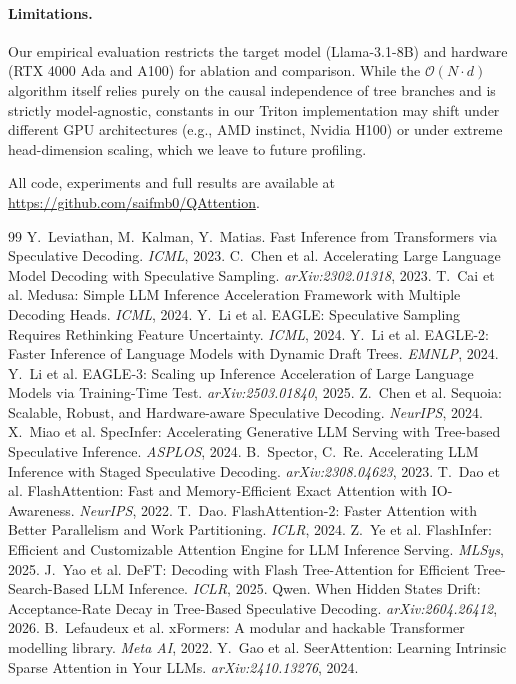 \documentclass{article}
\newcommand{\bigO}[1]{\mathcal{O}(#1)}
\newcommand{\numtokens}{N}
\newcommand{\depth}{d}
\begin{document}
\paragraph{Limitations.}
Our empirical evaluation restricts the target model (Llama-3.1-8B) and
hardware (RTX 4000 Ada and A100) for ablation and comparison.
While the $\bigO{\numtokens\!\cdot\!\depth}$ algorithm itself relies purely on
the causal independence of tree branches and is strictly model-agnostic,
constants in our Triton implementation may shift under different GPU
architectures (e.g., AMD instinct, Nvidia H100) or under extreme
head-dimension scaling, which we leave to future profiling.

All code, experiments and full results are available at \url{https://github.com/saifmb0/QAttention}.


\begin{thebibliography}{99}\small
{} Y.\ Leviathan, M.\ Kalman, Y.\ Matias.
  Fast Inference from Transformers via Speculative Decoding. \emph{ICML}, 2023.
 C.\ Chen et al.
  Accelerating Large Language Model Decoding with Speculative Sampling.
  \emph{arXiv:2302.01318}, 2023.
 T.\ Cai et al.
  Medusa: Simple LLM Inference Acceleration Framework with Multiple Decoding Heads.
  \emph{ICML}, 2024.
 Y.\ Li et al.
  EAGLE: Speculative Sampling Requires Rethinking Feature Uncertainty. \emph{ICML}, 2024.
 Y.\ Li et al.
  EAGLE-2: Faster Inference of Language Models with Dynamic Draft Trees.
  \emph{EMNLP}, 2024.
 Y.\ Li et al.
  EAGLE-3: Scaling up Inference Acceleration of Large Language Models via Training-Time Test.
  \emph{arXiv:2503.01840}, 2025.
 Z.\ Chen et al.
  Sequoia: Scalable, Robust, and Hardware-aware Speculative Decoding.
  \emph{NeurIPS}, 2024.
 X.\ Miao et al.
  SpecInfer: Accelerating Generative LLM Serving with Tree-based Speculative Inference.
  \emph{ASPLOS}, 2024.
 B.\ Spector, C.\ Re.
  Accelerating LLM Inference with Staged Speculative Decoding.
  \emph{arXiv:2308.04623}, 2023.
 T.\ Dao et al.
  FlashAttention: Fast and Memory-Efficient Exact Attention with IO-Awareness.
  \emph{NeurIPS}, 2022.
 T.\ Dao.
  FlashAttention-2: Faster Attention with Better Parallelism and Work Partitioning.
  \emph{ICLR}, 2024.
 Z.\ Ye et al.
  FlashInfer: Efficient and Customizable Attention Engine for LLM Inference Serving.
  \emph{MLSys}, 2025.
 J.\ Yao et al.
  DeFT: Decoding with Flash Tree-Attention for Efficient Tree-Search-Based LLM Inference.
  \emph{ICLR}, 2025.
 Qwen.
  When Hidden States Drift: Acceptance-Rate Decay in Tree-Based Speculative Decoding.
  \emph{arXiv:2604.26412}, 2026.
 B.\ Lefaudeux et al.
  xFormers: A modular and hackable Transformer modelling library.
  \emph{Meta AI}, 2022.
 Y.\ Gao et al.
  SeerAttention: Learning Intrinsic Sparse Attention in Your LLMs.
  \emph{arXiv:2410.13276}, 2024.
\end{thebibliography}
\end{document}
